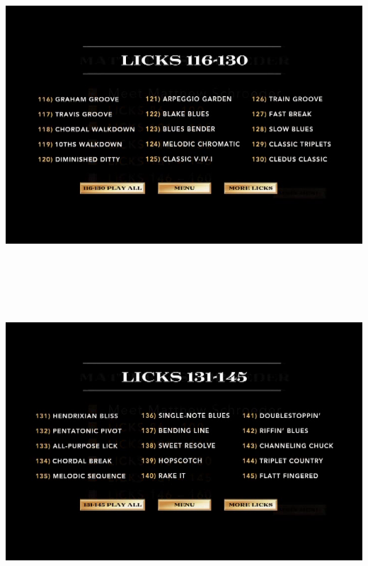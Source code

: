 \documentclass[a4paper]{book}
\begin{document}
\begin{center}
\includegraphics[width=17cm,height=11.333cm]{lebluessupportsmethodes-img10.png}
\end{center}
\clearpage

\begin{center}
\includegraphics[width=17cm,height=11.333cm]{lebluessupportsmethodes-img11.png}
\end{center}
\end{document}
